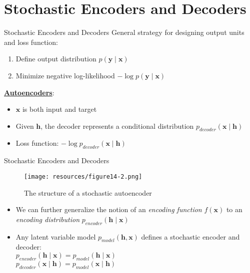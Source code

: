 \documentclass[handout]{beamer}
\begin{document}
\section{Stochastic Encoders and Decoders}
\begin{frame}[t]{Stochastic Encoders and Decoders}
   General strategy for designing output units and loss function:
\pause
   \begin{enumerate}
       \item Define output distribution $p(\pmb{y}\mid\pmb{x})$ 
\pause
           \item Minimize negative log-likelihood $-\log p(\pmb{y}\mid\pmb{x})$
   \end{enumerate}
\pause

   \vspace{0.3cm}
   \textbf{\underline{Autoencoders}}:
\pause
   \begin{itemize}
       \item $\pmb{x}$ is both input and target
\pause
       \item Given $\pmb{h}$, the decoder represents a conditional distribution $p_{decoder}(\pmb{x}\mid\pmb{h})$
\pause
       \item Loss function: $- \log p_{decoder}(\pmb{x}\mid\pmb{h})$
   \end{itemize}
\end{frame}


\begin{frame}[t]{Stochastic Encoders and Decoders}
    \begin{figure}[h]
        \centering
        \texttt{[image: resources/figure14-2.png]}
        \caption{The structure of a stochastic autoencoder}
    \end{figure}
    \begin{itemize}
        \item We can further generalize the notion of an \textit{encoding function} $f(\pmb{x})$ to an \textit{encoding distribution} $p_{encoder}(\pmb{h} \mid \pmb{x})$
        \pause
        \item Any latent variable model $p_{model}(\pmb{h},\pmb{x})$ defines a stochastic encoder and decoder:\\
            $p_{encoder}(\pmb{h}\mid\pmb{x}) = p_{model}(\pmb{h}\mid\pmb{x})$\\
            \vspace{0.1cm}
            $p_{decoder}(\pmb{x}\mid\pmb{h}) = p_{model}(\pmb{x}\mid\pmb{h})$
    \end{itemize}
\end{frame}
\end{document}

